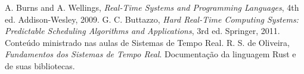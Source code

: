 \documentclass[conference]{IEEEtran}
\begin{document}
\begin{thebibliography}{00}
 A. Burns and A. Wellings, \textit{Real-Time Systems and Programming Languages}, 4th ed. Addison-Wesley, 2009.
 G. C. Buttazzo, \textit{Hard Real-Time Computing Systems: Predictable Scheduling Algorithms and Applications}, 3rd ed. Springer, 2011.
 Conteúdo ministrado nas aulas de Sistemas de Tempo Real.
 R. S. de Oliveira, \textit{Fundamentos dos Sistemas de Tempo Real}.
 Documentação da linguagem Rust e de suas bibliotecas.
\end{thebibliography}
\end{document}
